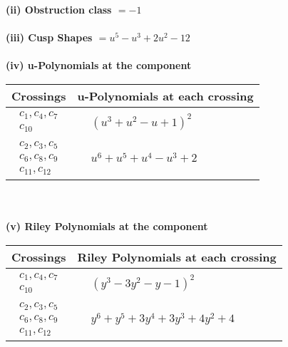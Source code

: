 \documentclass[1p]{elsarticle_modified}
\theoremstyle{definition}
\begin{document}
\flushleft \textbf{(ii) Obstruction class $= -1$}\\~\\
\flushleft \textbf{(iii) Cusp Shapes $= u^5- u^3+2 u^2-12$}\\~\\
\newpage\renewcommand{\arraystretch}{1}
\flushleft \textbf{(iv) u-Polynomials at the component}\newline \\
\begin{tabular}{m{50pt}|m{274pt}}
Crossings & \hspace{64pt}u-Polynomials at each crossing \\
\hline $$\begin{aligned}c_{1},c_{4},c_{7}\\c_{10}\end{aligned}$$&$\begin{aligned}
&(u^3+u^2- u+1)^2
\end{aligned}$\\
\hline $$\begin{aligned}c_{2},c_{3},c_{5}\\c_{6},c_{8},c_{9}\\c_{11},c_{12}\end{aligned}$$&$\begin{aligned}
&u^6+u^5+u^4- u^3+2
\end{aligned}$\\
\hline
\end{tabular}\\~\\
\newpage\renewcommand{\arraystretch}{1}
\flushleft \textbf{(v) Riley Polynomials at the component}\newline \\
\begin{tabular}{m{50pt}|m{274pt}}
Crossings & \hspace{64pt}Riley Polynomials at each crossing \\
\hline $$\begin{aligned}c_{1},c_{4},c_{7}\\c_{10}\end{aligned}$$&$\begin{aligned}
&(y^3-3 y^2- y-1)^2
\end{aligned}$\\
\hline $$\begin{aligned}c_{2},c_{3},c_{5}\\c_{6},c_{8},c_{9}\\c_{11},c_{12}\end{aligned}$$&$\begin{aligned}
&y^6+y^5+3 y^4+3 y^3+4 y^2+4
\end{aligned}$\\
\hline
\end{tabular}\\~\\
\end{document}
